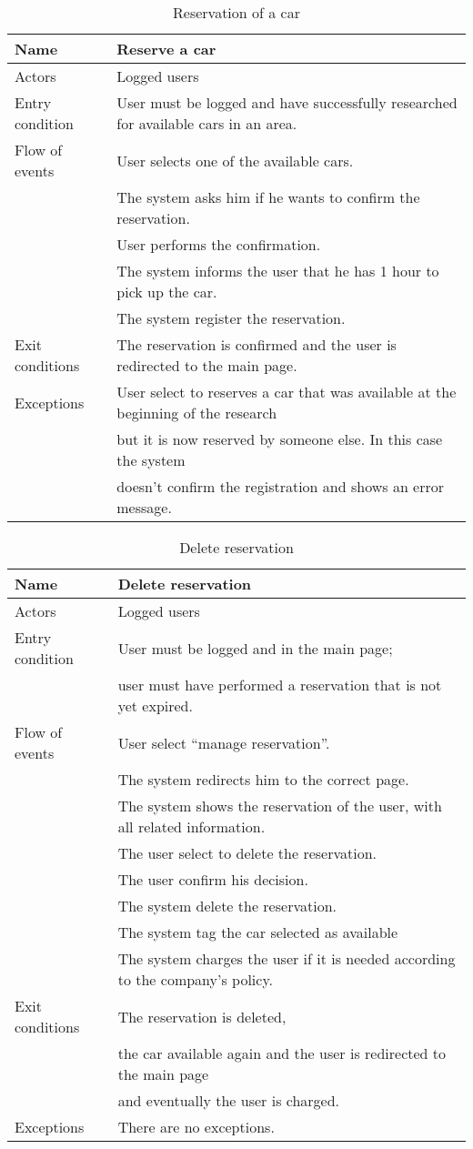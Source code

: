 \documentclass[10pt, a4paper,titlepage]{article}
\begin{document}
\begin{table}[h]
\caption{Reservation of a car} \label{tab:scenario4}
\begin{tabular}{|l|l|}
\hline
Name & Reserve a car\\
\hline
Actors & Logged users \\
\hline
Entry condition &  User must be logged and have successfully researched for available cars in an area. \\
\hline
Flow of events & User selects one of the available cars.\\
& The system asks him if he wants to confirm the reservation.\\
& User performs the confirmation.\\
& The system informs the user that he has 1 hour to pick up the car.\\
& The system register the reservation.\\
\hline
Exit conditions & The reservation is confirmed and the user is redirected to the main page. \\
\hline
Exceptions &User select to reserves a car that was available at the beginning of the research\\
& but it is now reserved by someone else. In this case the system\\
& doesn't confirm the registration and shows an error message.\\
\hline
\end{tabular}
\end{table}
\begin{table}[h]
\caption{Delete reservation} \label{tab:scenario5}
\begin{tabular}{|l|l|}
\hline
Name & Delete reservation \\
\hline
Actors & Logged users \\
\hline
Entry condition &  User must be logged and in the main page;\\
& user must have performed a reservation that is not yet expired. \\
\hline
Flow of events & User select “manage reservation”.\\
& The system redirects him to the correct page.\\
& The system shows the reservation of the user, with all related information.\\
& The user select to delete the reservation.\\
& The user confirm his decision.\\
& The system delete the reservation.\\
& The system tag the car selected as available\\
& The system charges the user if it is needed according to the company’s policy.\\
\hline
Exit conditions & The reservation  is deleted,\\
& the car available again and the user is redirected to the main page\\
& and eventually the user is charged.\\
\hline
Exceptions & There are no exceptions.\\
\hline
\end{tabular}
\end{table}
\end{document}
